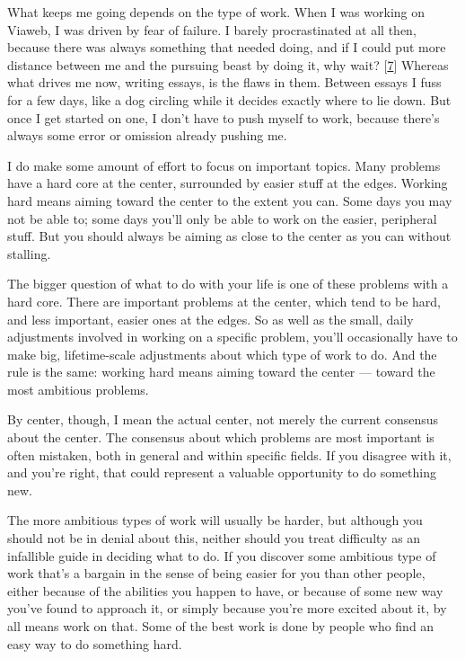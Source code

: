 What keeps me
                  going depends on the type of work. When I was working on
                  Viaweb, I was driven by fear of failure. I barely
                  procrastinated at all then, because there was always something
                  that needed doing, and if I could put more distance between me
                  and the pursuing beast by doing it, why wait?
                  [\href{\#f7n}{7}]
                  Whereas what drives me now, writing essays, is the flaws in
                  them. Between essays I fuss for a few days, like a dog
                  circling while it decides exactly where to lie down. But once
                  I get started on one, I don't have to push myself to work,
                  because there's always some error or omission already pushing
                  me.

I do make some amount of effort to focus on
                  important topics. Many problems have a hard core at the
                  center, surrounded by easier stuff at the edges. Working hard
                  means aiming toward the center to the extent you can. Some
                  days you may not be able to; some days you'll only be able to
                  work on the easier, peripheral stuff. But you should always be
                  aiming as close to the center as you can without stalling.

The
                  bigger question of what to do with your life is one of these
                  problems with a hard core. There are important problems at the
                  center, which tend to be hard, and less important, easier ones
                  at the edges. So as well as the small, daily adjustments
                  involved in working on a specific problem, you'll occasionally
                  have to make big, lifetime-scale adjustments about which type
                  of work to do. And the rule is the same: working hard means
                  aiming toward the center --- toward the most ambitious
                  problems.

By center, though, I mean the actual
                  center, not merely the current consensus about the center. The
                  consensus about which problems are most important is often
                  mistaken, both in general and within specific fields. If you
                  disagree with it, and you're right, that could represent a
                  valuable opportunity to do something new.

The more
                  ambitious types of work will usually be harder, but although
                  you should not be in denial about this, neither should you
                  treat difficulty as an infallible guide in deciding what to
                  do. If you discover some ambitious type of work that's a
                  bargain in the sense of being easier for you than other
                  people, either because of the abilities you happen to have, or
                  because of some new way you've found to approach it, or simply
                  because you're more excited about it, by all means work on
                  that. Some of the best work is done by people who find an easy
                  way to do something hard.

